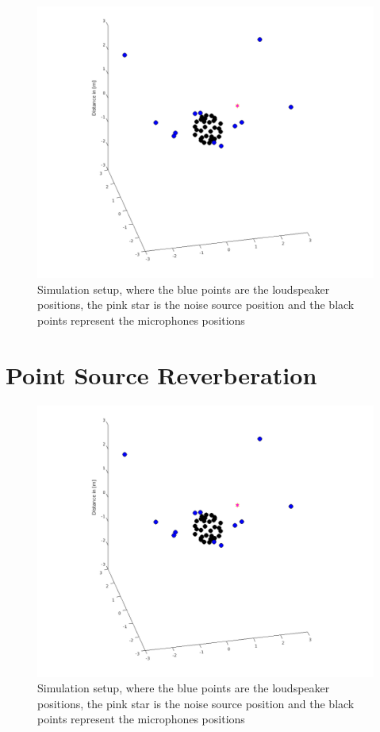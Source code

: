 \begin{figure}
    \centerline{\includegraphics[width=\paperwidth]{LaTeX/images/plots/ANCSetup.png}}
    \caption{Simulation setup, where the blue points are the loudspeaker positions, the pink star is the noise source position and the black points represent the microphones positions}
    \label{fig:setup}
\end{figure}

\section{Point Source Reverberation}


\begin{figure}
    \centerline{\includegraphics[width=\paperwidth]{LaTeX/images/plots/ANCSetup.png}}
    \caption{Simulation setup, where the blue points are the loudspeaker positions, the pink star is the noise source position and the black points represent the microphones positions}
    \label{fig:setup}
\end{figure}